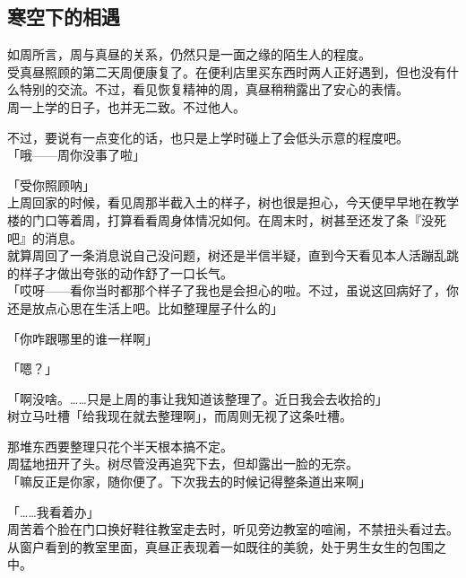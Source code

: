 \subsection{寒空下的相遇}

如周所言，周与真昼的关系，仍然只是一面之缘的陌生人的程度。\\

受真昼照顾的第二天周便康复了。在便利店里买东西时两人正好遇到，但也没有什么特别的交流。不过，看见恢复精神的周，真昼稍稍露出了安心的表情。\\

周一上学的日子，也并无二致。不过他人。

不过，要说有一点变化的话，也只是上学时碰上了会低头示意的程度吧。\\

「哦——周你没事了啦」

「受你照顾呐」\\

上周回家的时候，看见周那半截入土的样子，树也很是担心，今天便早早地在教学楼的门口等着周，打算看看周身体情况如何。在周末时，树甚至还发了条『没死吧』的消息。\\

就算周回了一条消息说自己没问题，树还是半信半疑，直到今天看见本人活蹦乱跳的样子才做出夸张的动作舒了一口长气。\\

「哎呀——看你当时都那个样子了我也是会担心的啦。不过，虽说这回病好了，你还是放点心思在生活上吧。比如整理屋子什么的」

「你咋跟哪里的谁一样啊」

「嗯？」

「啊没啥。……只是上周的事让我知道该整理了。近日我会去收拾的」\\

树立马吐槽「给我现在就去整理啊」，而周则无视了这条吐槽。

那堆东西要整理只花个半天根本搞不定。\\

周猛地扭开了头。树尽管没再追究下去，但却露出一脸的无奈。\\

「嘛反正是你家，随你便了。下次我去的时候记得整条道出来啊」

「……我看着办」\\

周苦着个脸在门口换好鞋往教室走去时，听见旁边教室的喧闹，不禁扭头看过去。\\

从窗户看到的教室里面，真昼正表现着一如既往的美貌，处于男生女生的包围之中。

